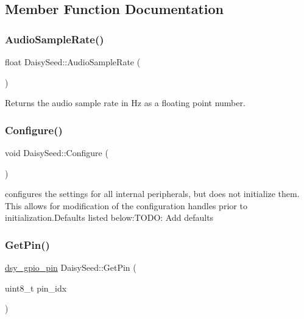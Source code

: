 \begin{DoxyCompactItemize}
\subsection{Member Function Documentation}
\mbox{\label{classdaisy_1_1_daisy_seed_acffca6aa0d05bdf730b7a70604fe6347}} 
\subsubsection{\texorpdfstring{Audio\+Sample\+Rate()}{AudioSampleRate()}}
{\footnotesize\ttfamily float Daisy\+Seed\+::\+Audio\+Sample\+Rate (\begin{DoxyParamCaption}{ }\end{DoxyParamCaption})}

Returns the audio sample rate in Hz as a floating point number. \mbox{\label{classdaisy_1_1_daisy_seed_a629b10d05c1df1eec01891996cbd3488}} 
\subsubsection{\texorpdfstring{Configure()}{Configure()}}
{\footnotesize\ttfamily void Daisy\+Seed\+::\+Configure (\begin{DoxyParamCaption}{ }\end{DoxyParamCaption})}

configures the settings for all internal peripherals, but does not initialize them. This allows for modification of the configuration handles prior to initialization.\+Defaults listed below\+:\+T\+O\+DO\+: Add defaults \mbox{\label{classdaisy_1_1_daisy_seed_aaa40562c6dc339155c6e34086395960d}} 
\subsubsection{\texorpdfstring{Get\+Pin()}{GetPin()}}
{\footnotesize\ttfamily \hyperlink{structdsy__gpio__pin}{dsy\+\_\+gpio\+\_\+pin} Daisy\+Seed\+::\+Get\+Pin (\begin{DoxyParamCaption}\item[{uint8\+\_\+t}]{pin\+\_\+idx }\end{DoxyParamCaption})}


\end{DoxyCompactItemize}
